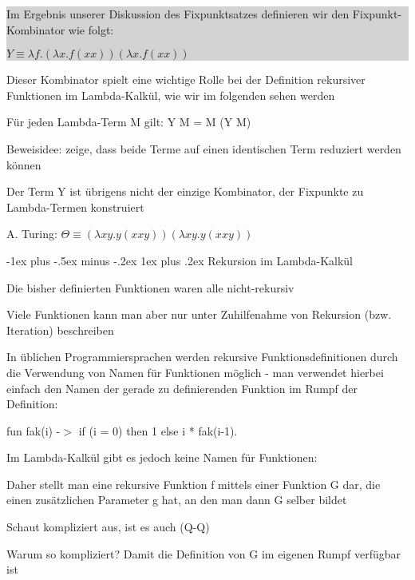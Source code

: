 \documentclass[10pt]{article}
\makeatletter
\renewcommand{\subsubsection}{\@startsection{subsubsection}{3}{0mm}%
                                {-1ex plus -.5ex minus -.2ex}%
                                {1ex plus .2ex}%
                                {\normalfont\small\bfseries}}
\makeatother
\begin{document}
\begin{itemize*}
\colorbox{lightgray}{
  \begin{minipage}[h]{1.0\linewidth}
    Im Ergebnis unserer Diskussion des Fixpunktsatzes definieren wir den Fixpunkt-Kombinator wie folgt: \\
    \begin{center}
      $Y \equiv \lambda f.(\lambda x.f(xx)) (\lambda x.f(xx))$
    \end{center}
  \end{minipage}
}
\begin{itemize*}
  \item Dieser Kombinator spielt eine wichtige Rolle bei der Definition rekursiver Funktionen im Lambda-Kalkül, wie wir im folgenden sehen werden
  \item Für jeden Lambda-Term M gilt: Y M = M (Y M)
  \begin{itemize*}
    \item Beweisidee: zeige, dass beide Terme auf einen identischen Term reduziert werden können
  \end{itemize*}
  \item Der Term Y ist übrigens nicht der einzige Kombinator, der Fixpunkte zu Lambda-Termen konstruiert
  \begin{itemize*}
    \item A. Turing: $\Theta \equiv (\lambda xy.y(xxy)) (\lambda xy.y(xxy))$
  \end{itemize*}
\end{itemize*}

\subsubsection{Rekursion im Lambda-Kalkül}
\begin{itemize*}
  \item Die bisher definierten Funktionen waren alle nicht-rekursiv
  \item Viele Funktionen kann man aber nur unter Zuhilfenahme von Rekursion (bzw. Iteration) beschreiben
  \item In üblichen Programmiersprachen werden rekursive Funktionsdefinitionen durch die Verwendung von Namen für Funktionen möglich - man verwendet hierbei einfach den Namen der gerade zu definierenden Funktion im Rumpf der Definition:
  \begin{itemize*}
    \item fun fak(i) -$>$ if (i = 0) then 1 else i * fak(i-1).
  \end{itemize*}
  \item Im Lambda-Kalkül gibt es jedoch keine Namen für Funktionen:
  \begin{itemize*}
    \item Daher stellt man eine rekursive Funktion f mittels einer Funktion G dar, die einen zusätzlichen Parameter g hat, an den man dann G selber bildet
    \item Schaut kompliziert aus, ist es auch (Q-Q)
    \item Warum so kompliziert? Damit die Definition von G im eigenen Rumpf verfügbar ist
    

\end{itemize*}
\end{itemize*}
\end{itemize*}
\end{document}
